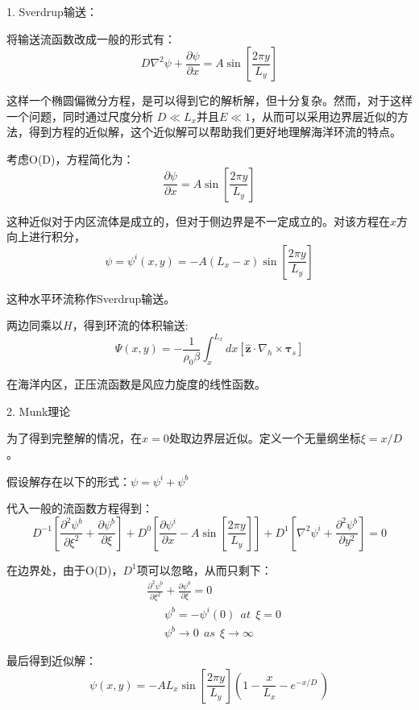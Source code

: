\documentclass{article}
\begin{document}
1. Sverdrup输送：

将输送流函数改成一般的形式有：
$$D{{\nabla }^{2}}\psi +\frac{\partial \psi }{\partial x}=A\sin \left[ \frac{2\pi y}{{{L}_{y}}}\right] $$

这样一个椭圆偏微分方程，是可以得到它的解析解，但十分复杂。然而，对于这样一个问题，同时通过尺度分析 $D \ll L_x$并且$E \ll 1$，从而可以采用边界层近似的方法，得到方程的近似解，这个近似解可以帮助我们更好地理解海洋环流的特点。

考虑O(D)，方程简化为：
$$\frac{\partial \psi }{\partial x}=A\sin \left[ \frac{2\pi y}{{{L}_{y}}} \right]$$

这种近似对于内区流体是成立的，但对于侧边界是不一定成立的。对该方程在$x$方向上进行积分，
$$\psi ={{\psi }^{i}}\left( x,y \right)=-A({{L}_{x}}-x)\sin \left[ \frac{2\pi y}{{{L}_{y}}} \right]$$

这种水平环流称作Sverdrup输送。

两边同乘以$H$，得到环流的体积输送:
$$\Psi \left( x,y \right)=-\frac{1}{{{\rho }_{0}}\beta }\int_{x}^{{{L}_{x}}}{dx\left[ \mathbf{\hat{z}}\cdot {{\nabla }_{h}}\times {{\mathbf{\tau }}_{s}} \right]}$$

在海洋内区，正压流函数是风应力旋度的线性函数。

2. Munk理论

为了得到完整解的情况，在$x=0$处取边界层近似。定义一个无量纲坐标$\xi=x/D$。

假设解存在以下的形式：$\psi = \psi^i +\psi^b$

代入一般的流函数方程得到：
$${{D}^{-1}}\left[ \frac{{{\partial }^{2}}{{\psi }^{b}}}{\partial {{\xi }^{2}}}+\frac{\partial {{\psi }^{b}}}{\partial \xi } \right]+{{D}^{0}}\left[ \frac{\partial {{\psi }^{i}}}{\partial x}-A\sin \left[ \frac{2\pi y}{{{L}_{y}}} \right] \right]+{{D}^{1}}\left[ {{\nabla }^{2}}{{\psi }^{i}}+\frac{{{\partial }^{2}}{{\psi }^{b}}}{\partial {{y}^{2}}} \right]=0$$

在边界处，由于O(D)，$D^1$项可以忽略，从而只剩下：
\begin{align}
  & \frac{{{\partial }^{2}}{{\psi }^{b}}}{\partial {{\xi }^{2}}}+\frac{\partial {{\psi }^{b}}}{\partial \xi }=0 \\ 
 & \ \ \ \ \ \ \ {{\psi }^{b}}=-{{\psi }^{i}}(0)\ \ at\ \ \xi =0 \\ 
 & \ \ \ \ \ \ \ {{\psi }^{b}}\to 0\ \ as\ \ \xi \to \infty \ \ \ \  
\end{align}

最后得到近似解：
$$\psi \left( x,y \right)=-A{{L}_{x}}\sin \left[ \frac{2\pi y}{{{L}_{y}}} \right]\left( 1-\frac{x}{{{L}_{x}}}-{{e}^{{-x}/{D}\;}} \right)$$
\end{document}
